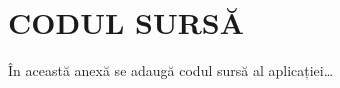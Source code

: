 \setcounter{chapter}{0}
\renewcommand{\thechapter}{\Alph{chapter}}

\chapter{CODUL SURSĂ}

În această anexă se adaugă codul sursă al aplicației…
